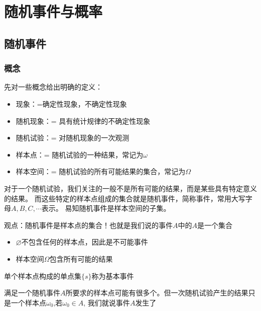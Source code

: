 \chapter{随机事件与概率}
\section{随机事件}
\subsection*{概念}
\begin{definition}
    先对一些概念给出明确的定义：
    \begin{itemize}
        \item 现象：={确定性现象，不确定性现象}
        \item 随机现象：= 具有统计规律的不确定性现象
        \item 随机试验：= 对随机现象的一次观测
        \item 样本点：= 随机试验的一种结果，常记为$\omega$
        \item 样本空间：= 随机试验的所有可能结果的集合，常记为$\Omega$
    \end{itemize}
\end{definition}
\begin{definition}[随机事件]
    对于一个随机试验，我们关注的一般不是所有可能的结果，而是某些具有特定意义的结果。
    而这些特定的样本点组成的集合就是随机事件，简称事件，常用大写字母$A,B,C,\cdots$表示。
    易知随机事件是样本空间的子集。
\end{definition}
\begin{remark}
    观点：随机事件是样本点的集合！也就是我们说的事件$A$中的$A$是一个集合
\end{remark}

\begin{definition}
    \begin{itemize}
        \item $\varnothing$不包含任何的样本点，因此是不可能事件
        \item 样本空间$\Omega$包含所有可能的结果
    \end{itemize}
\end{definition}

\begin{definition}[基本事件]
    单个样本点构成的单点集$\{s\}$称为基本事件
\end{definition}

\begin{definition}[事件的发生]
    满足一个随机事件$A$所要求的样本点可能有很多个。但一次随机试验产生的结果只是一个样本点$\omega_0$,若$\omega_0 \in A$,
    我们就说事件$A$发生了
\end{definition}

